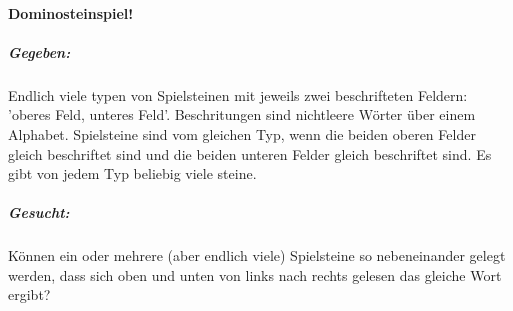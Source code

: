   \paragraph{Dominosteinspiel!}
  \subparagraph{Gegeben: } 
    Endlich viele typen von Spielsteinen mit jeweils zwei beschrifteten Feldern: 'oberes Feld, unteres Feld'. Beschritungen sind nichtleere Wörter über einem Alphabet. Spielsteine sind vom gleichen Typ, wenn die beiden oberen Felder gleich beschriftet sind und die beiden unteren Felder gleich beschriftet sind. Es gibt von jedem Typ beliebig viele steine. 

  \subparagraph{Gesucht: }
    Können ein oder mehrere (aber endlich viele) Spielsteine so nebeneinander gelegt werden, dass sich oben und unten von links nach rechts gelesen das gleiche Wort ergibt?

